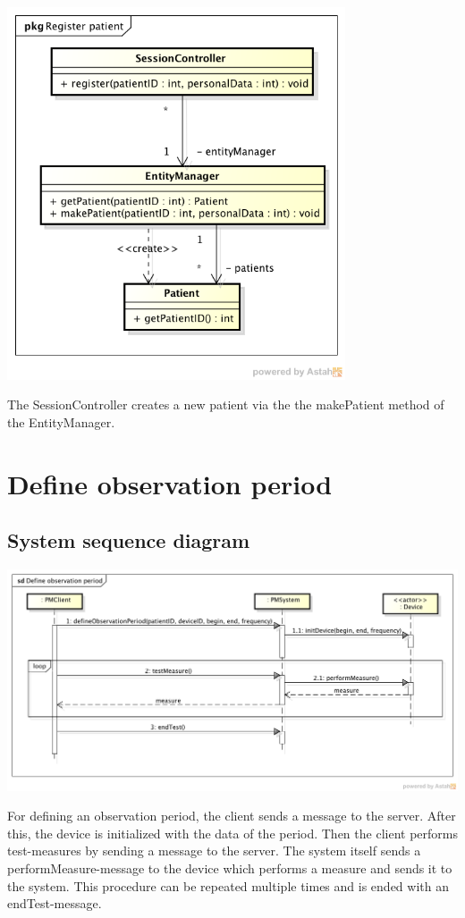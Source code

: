 \documentclass[fontsize=12pt,
               paper=a4,
               twoside=false,
               parskip=half,
               ]{scrartcl}
\begin{document}
\includegraphics[width=10cm]{./img/design-class-diagrams/register-patient.png}

The SessionController creates a new patient via the the makePatient method of the EntityManager.

\section{Define observation period}

\subsection{System sequence diagram}

\includegraphics[width=15cm]{./img/system-sequence-diagrams/define-observation-period.png}

For defining an observation period, the client sends a message to the server. After this, the device is initialized with the data of the period. Then the client performs test-measures by sending a message to the server. The system itself sends a performMeasure-message to the device which performs a measure and sends it to the system. This procedure can be repeated multiple times and is ended with an endTest-message.
\end{document}
